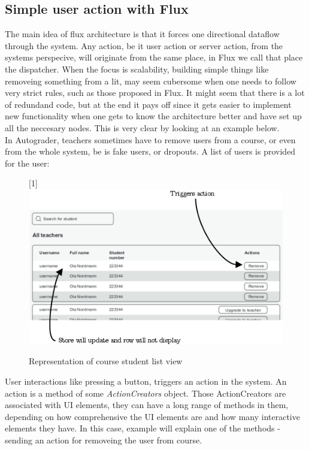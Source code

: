 \subsection{Simple user action with Flux}\label{sex:simplefluxexample}
The main idea of flux architecture is that it forces one directional dataflow through the system. Any action, be it user action or server action, from the systems perspecive, will originate from the same place, in Flux we call that place the dispatcher. When the focus is scalability, building simple things like removeing something from a lit, may seem cubersome when one needs to follow very strict rules, such as those proposed in Flux. It might seem that there is a lot of redundand code, but at the end it pays off since it gets easier to implement new functionality when one gets to know the architecture better and have set up all the neccesary nodes. This is very clear by looking at an example below.
\\In Autograder, teachers sometimes have to remove users from a course, or even from the whole system, be is fake users, or dropouts. A list of users is provided for the user:
\begin{figure}[h]
  \scalebox{1}[1]{{\includegraphics[width=1\linewidth]{graphics/simpleremoveuser.png}}}
  \caption{Representation of course student list view }
  \label{fig:simpleremoveuser}
\end{figure}
User interactions like pressing a button, triggers an action in the system. An action is a method of some \emph{ActionCreators} object. Those ActionCreators are associated with UI elements, they can have a long range of methods in them, depending on how comprehensive the UI elements are and how many interactive elements they have. In this case, example will explain one of the methods - sending an action for removeing the user from course.
